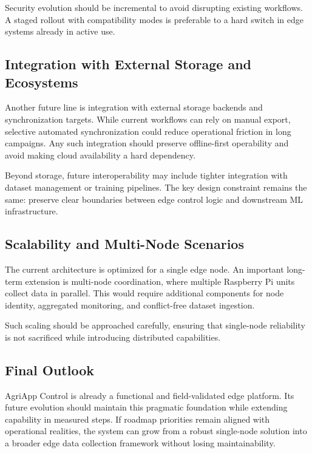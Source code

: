 Security evolution should be incremental to avoid disrupting existing workflows. A staged rollout with compatibility modes is preferable to a hard switch in edge systems already in active use.

\subsection{Integration with External Storage and Ecosystems}
Another future line is integration with external storage backends and synchronization targets. While current workflows can rely on manual export, selective automated synchronization could reduce operational friction in long campaigns. Any such integration should preserve offline-first operability and avoid making cloud availability a hard dependency.

Beyond storage, future interoperability may include tighter integration with dataset management or training pipelines. The key design constraint remains the same: preserve clear boundaries between edge control logic and downstream ML infrastructure.

\subsection{Scalability and Multi-Node Scenarios}
The current architecture is optimized for a single edge node. An important long-term extension is multi-node coordination, where multiple Raspberry Pi units collect data in parallel. This would require additional components for node identity, aggregated monitoring, and conflict-free dataset ingestion.

Such scaling should be approached carefully, ensuring that single-node reliability is not sacrificed while introducing distributed capabilities.

\subsection{Final Outlook}
AgriApp Control is already a functional and field-validated edge platform. Its future evolution should maintain this pragmatic foundation while extending capability in measured steps. If roadmap priorities remain aligned with operational realities, the system can grow from a robust single-node solution into a broader edge data collection framework without losing maintainability.
